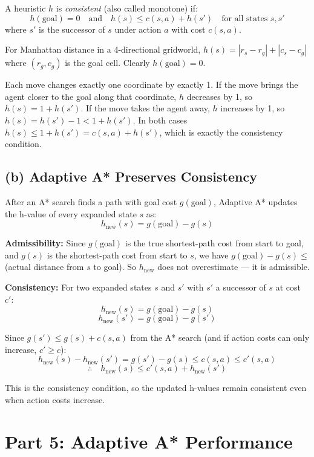 \documentclass[12pt]{article}
\begin{document}
A heuristic $h$ is \textit{consistent} (also called monotone) if:
\[h(\text{goal}) = 0 \quad \text{and} \quad h(s) \leq c(s, a) + h(s') \quad \text{for all states } s, s'\]
where $s'$ is the successor of $s$ under action $a$ with cost $c(s,a)$.

For Manhattan distance in a 4-directional gridworld, $h(s) = |r_s - r_g| + |c_s - c_g|$ where $(r_g, c_g)$ is the goal cell. Clearly $h(\text{goal}) = 0$.

Each move changes exactly one coordinate by exactly 1. If the move brings the agent closer to the goal along that coordinate, $h$ decreases by 1, so $h(s) = 1 + h(s')$. If the move takes the agent away, $h$ increases by 1, so $h(s) = h(s') - 1 < 1 + h(s')$. In both cases $h(s) \leq 1 + h(s') = c(s,a) + h(s')$, which is exactly the consistency condition.

\subsection*{(b) Adaptive A* Preserves Consistency}

After an A* search finds a path with goal cost $g(\text{goal})$, Adaptive A* updates the h-value of every expanded state $s$ as:
\[h_\text{new}(s) = g(\text{goal}) - g(s)\]

\textbf{Admissibility:} Since $g(\text{goal})$ is the true shortest-path cost from start to goal, and $g(s)$ is the shortest-path cost from start to $s$, we have $g(\text{goal}) - g(s) \leq$ (actual distance from $s$ to goal). So $h_\text{new}$ does not overestimate --- it is admissible.

\textbf{Consistency:} For two expanded states $s$ and $s'$ with $s'$ a successor of $s$ at cost $c'$:
\[h_\text{new}(s) = g(\text{goal}) - g(s)\]
\[h_\text{new}(s') = g(\text{goal}) - g(s')\]

Since $g(s') \leq g(s) + c(s, a)$ from the A* search (and if action costs can only increase, $c' \geq c$):
\[h_\text{new}(s) - h_\text{new}(s') = g(s') - g(s) \leq c(s, a) \leq c'(s, a)\]
\[\therefore\quad h_\text{new}(s) \leq c'(s,a) + h_\text{new}(s')\]

This is the consistency condition, so the updated h-values remain consistent even when action costs increase.

\section*{Part 5: Adaptive A* Performance}
\end{document}
